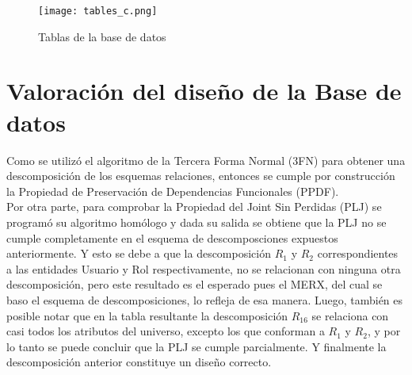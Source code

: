\documentclass{report}
\begin{document}
    \begin{figure}[htb]
        \centering
        \texttt{[image: tables\_c.png]}
        \caption{Tablas de la base de datos}
    \end{figure}

    \section*{Valoración del diseño de la Base de datos}
    Como se utilizó el algoritmo de la Tercera Forma Normal (3FN) para obtener una descomposición de los esquemas relaciones, 
    entonces se cumple por construcción la Propiedad de Preservación de Dependencias Funcionales (PPDF). \\

    Por otra parte, para comprobar la Propiedad del Joint Sin Perdidas (PLJ) se programó su algoritmo homólogo y dada su salida se obtiene que la PLJ no se cumple completamente en el esquema de descomposciones expuestos anteriormente.
    Y esto se debe a que la descomposición $R_1$ y $R_2$ correspondientes a las entidades Usuario y Rol respectivamente, no se relacionan con ninguna otra descomposición, pero este resultado es el esperado pues el MERX, del cual se baso el esquema de descomposiciones, lo refleja de esa manera.
    Luego, también es posible notar que en la tabla resultante la descomposición $R_{16}$  se relaciona con casi todos los atributos del universo, excepto los que conforman a $R_1$ y $R_2$, y por lo tanto se puede concluir que la PLJ se cumple parcialmente. 
    Y finalmente la descomposición anterior constituye un diseño correcto.
\end{document}
